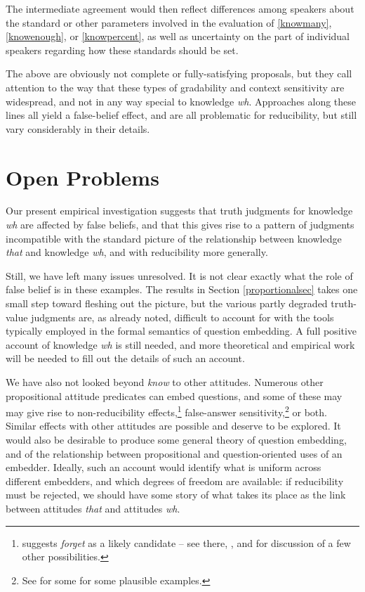 \documentclass[a4paper]{article}
\begin{document}
The intermediate agreement would then reflect differences among speakers about the standard or other parameters involved in the evaluation of \ref{knowmany}, \ref{knowenough}, or \ref{knowpercent}, as well as uncertainty on the part of individual speakers regarding how these standards should be set.

The above are obviously not complete or fully-satisfying proposals, but they call attention to the way that these types of gradability and context  sensitivity are widespread, and not in any way special to knowledge \textit{wh}. Approaches along these lines all yield a false-belief effect, and are all problematic for reducibility, but still vary considerably in their details.

\section{Open Problems}

Our present empirical investigation suggests that truth judgments for knowledge \textit{wh} are affected by false beliefs, and that this gives rise to a pattern of judgments incompatible with the standard picture of the relationship between knowledge \textit{that} and knowledge \textit{wh}, and with reducibility more generally. 

Still, we have left many issues unresolved. It is not clear exactly what the role of false belief is in these examples. The results in Section \ref{proportionalsec} takes one small step toward fleshing out the picture, but the various partly degraded truth-value judgments are, as already noted, difficult to account for with the tools typically employed in the formal semantics of question embedding. A full positive account of knowledge \textit{wh} is still needed, and more theoretical and empirical work will be needed to fill out the details of such an account.

We have also not looked beyond \textit{know} to other attitudes. Numerous other propositional attitude predicates can embed questions, and some of these may may give rise to non-reducibility effects,\footnote{\cite{george:dis} suggests \textit{forget} as a likely candidate -- see there, \citet{kr:11}, and \citet{cg:15} for discussion of a few other possibilities.} false-answer sensitivity,\footnote{See \citet{berman,heim:94,kr:11,preuss} for some for some plausible examples.} or both. Similar effects with other attitudes are possible and deserve to be explored. It would also be desirable to produce some general theory of question embedding, and of the relationship between propositional and question-oriented uses of an embedder. Ideally, such an account would identify what is uniform across different embedders, and which degrees of freedom are available: if reducibility must be rejected, we should have some story of what takes its place as the link between attitudes \textit{that} and attitudes \textit{wh}.
\end{document}
